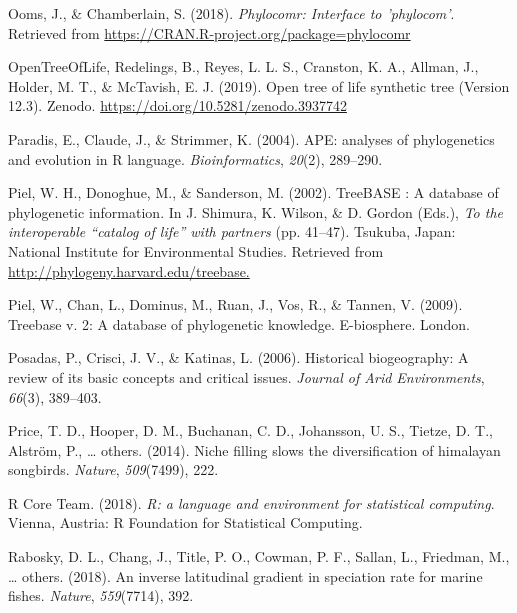 \documentclass[
  english,
  man]{apa6}
\newlength{\cslhangindent}
\newlength{\cslentryspacingunit} %
\newenvironment{CSLReferences}[2] %
 {%
  \setlength{\parindent}{0pt}
  \ifodd #1
  \let\oldpar\par
  \def\par{\hangindent=\cslhangindent\oldpar}
  \fi
  \setlength{\parskip}{#2\cslentryspacingunit}
 }%
 {}
\begin{document}
\begin{CSLReferences}{1}{0}
\leavevmode{}%
Ooms, J., \& Chamberlain, S. (2018). \emph{Phylocomr: Interface to 'phylocom'}. Retrieved from \url{https://CRAN.R-project.org/package=phylocomr}

\leavevmode{}%
OpenTreeOfLife, Redelings, B., Reyes, L. L. S., Cranston, K. A., Allman, J., Holder, M. T., \& McTavish, E. J. (2019). Open tree of life synthetic tree (Version 12.3). Zenodo. \url{https://doi.org/10.5281/zenodo.3937742}

\leavevmode{}%
Paradis, E., Claude, J., \& Strimmer, K. (2004). {APE: analyses of phylogenetics and evolution in R language}. \emph{Bioinformatics}, \emph{20}(2), 289--290.

\leavevmode{}%
Piel, W. H., Donoghue, M., \& Sanderson, M. (2002). {TreeBASE : A database of phylogenetic information}. In J. Shimura, K. Wilson, \& D. Gordon (Eds.), \emph{To the interoperable {``catalog of life''} with partners} (pp. 41--47). Tsukuba, Japan: National Institute for Environmental Studies. Retrieved from \url{http://phylogeny.harvard.edu/treebase.}

\leavevmode{}%
Piel, W., Chan, L., Dominus, M., Ruan, J., Vos, R., \& Tannen, V. (2009). Treebase v. 2: A database of phylogenetic knowledge. E-biosphere. London.

\leavevmode{}%
Posadas, P., Crisci, J. V., \& Katinas, L. (2006). Historical biogeography: A review of its basic concepts and critical issues. \emph{Journal of Arid Environments}, \emph{66}(3), 389--403.

\leavevmode{}%
Price, T. D., Hooper, D. M., Buchanan, C. D., Johansson, U. S., Tietze, D. T., Alström, P., \ldots{} others. (2014). Niche filling slows the diversification of himalayan songbirds. \emph{Nature}, \emph{509}(7499), 222.

\leavevmode{}%
R Core Team. (2018). \emph{{R: a language and environment for statistical computing}}. Vienna, Austria: R Foundation for Statistical Computing.

\leavevmode{}%
Rabosky, D. L., Chang, J., Title, P. O., Cowman, P. F., Sallan, L., Friedman, M., \ldots{} others. (2018). An inverse latitudinal gradient in speciation rate for marine fishes. \emph{Nature}, \emph{559}(7714), 392.


\end{CSLReferences}
\end{document}
